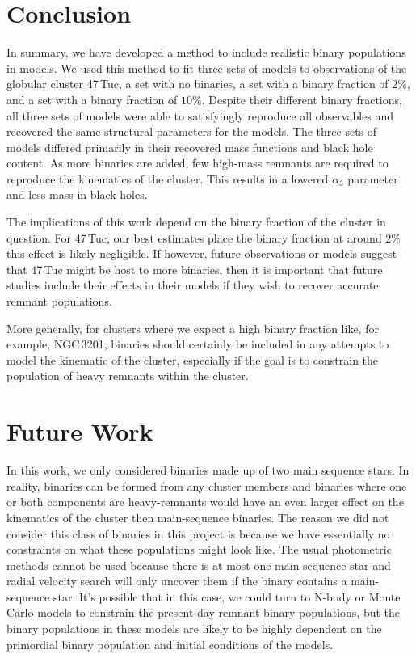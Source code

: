 
\section{Conclusion}


In summary, we have developed a method to include realistic binary populations in 
models. We used this method to fit three sets of models to observations of the globular cluster
47\,Tuc, a set with no binaries, a set with a binary fraction of $2\%$, and a set with a binary
fraction of $10\%$. Despite their different binary fractions, all three sets of models were able to
satisfyingly reproduce all observables and recovered the same structural parameters for the models.
The three sets of models differed primarily in their recovered mass functions and black hole
content. As more binaries are added, few high-mass remnants are required to reproduce the kinematics
of the cluster. This results in a lowered $\alpha_3$ parameter and less mass in black holes.

The implications of this work depend on the binary fraction of the cluster in question. For 47\,Tuc,
our best estimates place the binary fraction at around $2\%$ this effect is likely negligible. If
however, future observations or models suggest that 47\,Tuc might be host to more binaries, then it
is important that future studies include their effects in their models if they wish to recover
accurate remnant populations.


More generally, for clusters where we expect a high binary fraction like, for example, NGC\,3201,
binaries should certainly be included in any attempts to model the kinematic of the cluster,
especially if the goal is to constrain the population of heavy remnants within the cluster.



\section{Future Work}



In this work, we only considered binaries made up of two main sequence stars. In reality, binaries
can be formed from any cluster members and binaries where one or both components are heavy-remnants
would have an even larger effect on the kinematics of the cluster then main-sequence binaries. The
reason we did not consider this class of binaries in this project is because we have essentially no
constraints on what these populations might look like. The usual photometric methods cannot be used
because there is at most one main-sequence star and radial velocity search will only uncover them if
the binary contains a main-sequence star. It's possible that in this case, we could turn to N-body
or Monte Carlo models to constrain the present-day remnant binary populations, but the binary
populations in these models are likely to be highly dependent on the primordial binary population
and initial conditions of the models.

